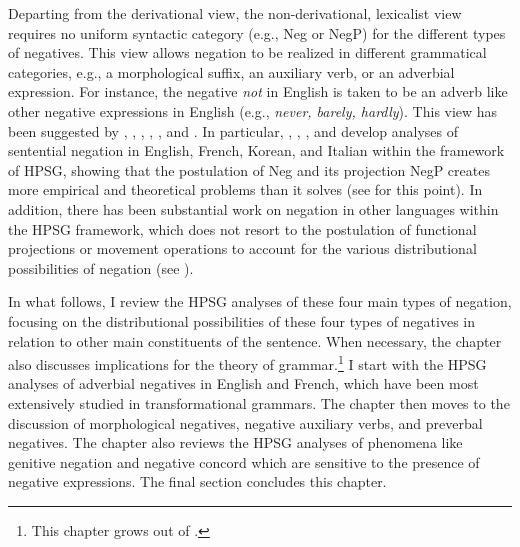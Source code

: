\documentclass[output=paper
                ,modfonts
                ,nonflat
	        ,collection
	        ,collectionchapter
	        ,collectiontoclongg
 	        ,biblatex
                ,babelshorthands
                ,newtxmath
                ,draftmode
                ,colorlinks, citecolor=brown
]{./langsci/langscibook}
\begin{document}
{Departing from the derivational view, the non-derivational, lexicalist view
requires no uniform syntactic category (e.g., Neg or NegP) for the different types of negatives. This view allows negation to be realized in different grammatical categories, e.g., a morphological suffix, an auxiliary verb, or an adverbial expression. For instance, the negative {\it not} in English is taken to be an adverb like other negative expressions in English (e.g., \textit{never, barely, hardly}). This view has been suggested by \citet{Jackendoff:72}, \citet{Baker:91}, \citet{Ernst:92}, \citet{AG:97}, \citet{Kim:00}, and \citet{Warner2000a-u}. In particular,
\citet{KS:96}, \citet{AG:97}, \citet{Kim:00}, and \citet{KS:02} develop analyses of sentential negation in English, French, Korean, and Italian within the framework of HPSG, showing that the postulation of Neg and its projection NegP creates more empirical and theoretical problems than it solves (see \citealt{Newmeyer:2006} for this point).
In addition, there has been substantial work on negation in other languages within the HPSG framework, which
does not resort to the postulation of functional projections or movement operations to account for the various distributional possibilities
of negation (see \citealt{PK:99, BJ:00, Prz:00, Kupsc:02, Swart:02, Borsley:05, Crysmann:10, Bender:13}).

In what follows, I review the HPSG analyses of these four main types of negation,
focusing on the distributional possibilities of these four types of negatives in
relation to other main constituents of the sentence. When
necessary, the chapter also discusses implications for
the theory of grammar.\footnote{This chapter grows out of \citet{Kim:00,kim:18}.} I
start with the HPSG analyses of adverbial negatives in English and French, which have been most extensively studied in transformational grammars.
The chapter then moves to the discussion of morphological
negatives, negative auxiliary verbs, and preverbal negatives. The chapter
also reviews the HPSG analyses of phenomena like genitive negation and
negative concord which are sensitive to the presence of negative expressions. The
final section concludes this chapter.


}
\end{document}
